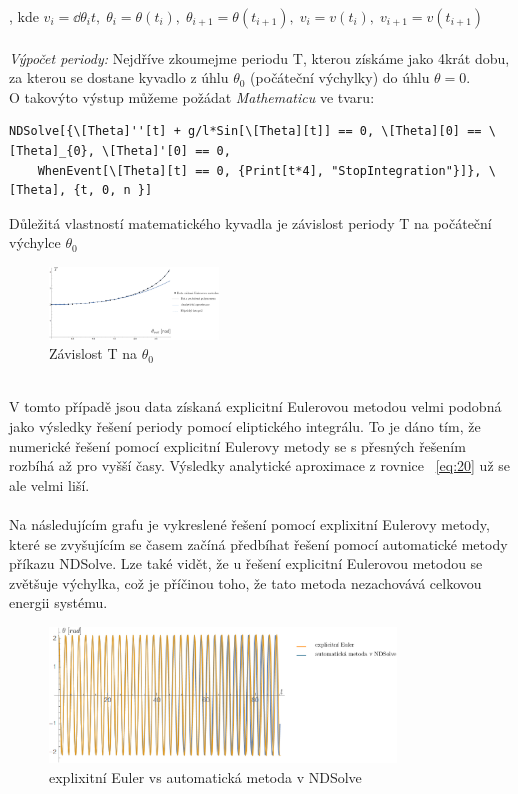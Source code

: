 \documentclass[reqno, a4paper]{amsart}
\begin{document}
, kde $ v_{i}=\dd{\theta_{i}}{t},\; \theta_{i}=\theta(t_{i}),\;\theta_{i+1}=\theta(t_{i+1}),\;v_{i}=v(t_{i}),\;v_{i+1}=v(t_{i+1})$
\\
\\
\textit{Výpočet periody:} Nejdříve zkoumejme periodu T, kterou získáme jako 4krát dobu, za kterou se dostane kyvadlo z úhlu $\theta_{0}$ (počáteční výchylky) do úhlu $\theta=0$. 
\\
O takovýto výstup můžeme požádat \textit{Mathematicu} ve tvaru:  
\begin{verbatim}
NDSolve[{\[Theta]''[t] + g/l*Sin[\[Theta][t]] == 0, \[Theta][0] == \[Theta]_{0}, \[Theta]'[0] == 0, 
	WhenEvent[\[Theta][t] == 0, {Print[t*4], "StopIntegration"}]}, \[Theta], {t, 0, n }]
\end{verbatim}
Důležitá vlastností matematického kyvadla je závislost periody T na počáteční výchylce $\theta_{0}$
\begin{figure}[h]
	\centering
	\includegraphics[width=0.4\textwidth]{graf1}
	\caption*{Závislost T na $\theta_{0}$}  
\end{figure}
\\
V tomto případě jsou data získaná explicitní Eulerovou metodou velmi podobná jako výsledky řešení periody pomocí eliptického integrálu. To je dáno tím, že numerické řešení pomocí explicitní Eulerovy metody se s přesných řešením rozbíhá až pro vyšší časy. Výsledky analytické aproximace z rovnice ~\eqref{eq:20} už se ale velmi liší.
\\
\\
Na následujícím grafu je vykreslené řešení pomocí explixitní Eulerovy metody, které se zvyšujícím se časem začíná předbíhat řešení pomocí automatické metody příkazu NDSolve. Lze také vidět, že u řešení explicitní Eulerovou metodou se zvětšuje výchylka, což je příčinou toho, že tato metoda nezachovává celkovou energii systému.
\begin{figure}[h]
	\centering
	\includegraphics[width=0.82\textwidth]{vs}
	\caption*{explixitní Euler vs automatická metoda v NDSolve}  
\end{figure}
\end{document}

